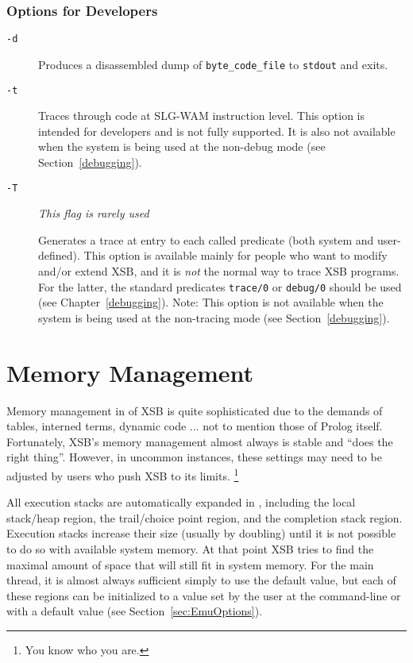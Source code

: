 \subsubsection{Options for Developers}
\begin{description}
\item[{\tt -d}] Produces a disassembled dump of {\tt byte\_code\_file} to 
    {\tt stdout} and exits.
  \item[{\tt -t}] Traces through code at SLG-WAM instruction level.
  This option is intended for developers and is not fully supported.
  It is also not available when the system is being used at the
  non-debug mode (see Section~\ref{debugging}).
\item[{\tt -T}]
    {\em This flag is rarely used}

    Generates a trace at entry to each called predicate
    (both system and user-defined).  This option is available mainly
    for people who want to modify and/or extend XSB, and it is
    {\em not\/} the normal way to trace XSB programs.  For the
    latter, the standard predicates {\tt trace/0} or {\tt debug/0}
    should be used (see Chapter~\ref{debugging}).
    Note: This option is not available when the system is being used
    at the non-tracing mode (see Section~\ref{debugging}).

\end{description}

\section{Memory Management}\label{memory_management}
 

Memory management in \version{} of XSB is quite sophisticated due to
the demands of tables, interned terms, dynamic code ... not to mention
those of Prolog itself.  Fortunately, XSB's memory management almost
always is stable and ``does the right thing''.  However, in uncommon
instances, these settings may need to be adjusted by users who push
XSB to its limits. \footnote{You know who you are.}

All execution stacks are automatically expanded in \version{},
including the local stack/heap region, the trail/choice point region,
and the completion stack region.  Execution stacks increase their size
(usually by doubling) until it is not possible to do so with available
system memory.  At that point XSB tries to find the maximal amount of
space that will still fit in system memory.  For the main thread, it
is almost always sufficient simply to use the default value, but each
of these regions can be initialized to a value set by the user at the
command-line or with a default value (see Section~\ref{sec:EmuOptions}). 

